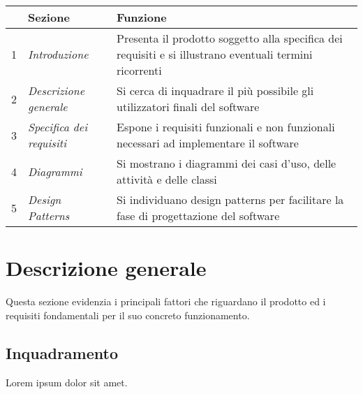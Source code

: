 \documentclass{scrreprt}
\begin{document}
\FloatBarrier
\begin{table}[h|]
\centering
\begin{tabular}{|l|l|p{10cm}|}
\hline
 & \textbf{Sezione} & \textbf{Funzione} \\ \hline

1 & \textit{Introduzione} & Presenta il prodotto soggetto alla
specifica dei requisiti e si illustrano eventuali termini
ricorrenti \\ \hline

2 & \textit{Descrizione generale} & Si cerca di inquadrare il
più possibile gli utilizzatori finali del software \\ \hline

3 & \textit{Specifica dei requisiti} & Espone i requisiti funzionali
e non funzionali necessari ad implementare il software \\ \hline

4 & \textit{Diagrammi} & Si mostrano i diagrammi dei casi d'uso,
delle attività e delle classi \\ \hline

5 & \textit{Design Patterns} & Si individuano design patterns per
facilitare la fase di progettazione del software \\ \hline
\end{tabular}
\end{table}
\FloatBarrier


\chapter{Descrizione generale}
Questa sezione evidenzia i principali fattori che riguardano il
prodotto ed i requisiti fondamentali per il suo concreto funzionamento.


\section{Inquadramento}
\label{sec:inquadramento}
Lorem ipsum dolor sit amet.
\end{document}
